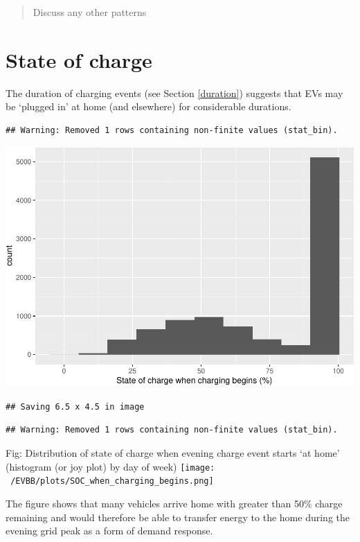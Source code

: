 \documentclass[]{article}
\begin{document}
\begin{quote}
Discuss any other patterns
\end{quote}

\section{State of charge}\label{state-of-charge}

The duration of charging events (see Section \ref{duration}) suggests
that EVs may be `plugged in' at home (and elsewhere) for considerable
durations.

\begin{verbatim}
## Warning: Removed 1 rows containing non-finite values (stat_bin).
\end{verbatim}

\includegraphics{EVBB_report_files/figure-latex/value of state of charge at beginning of charge-1.pdf}

\begin{verbatim}
## Saving 6.5 x 4.5 in image
\end{verbatim}

\begin{verbatim}
## Warning: Removed 1 rows containing non-finite values (stat_bin).
\end{verbatim}

Fig: Distribution of state of charge when evening charge event starts
`at home' (histogram (or joy plot) by day of week)
\texttt{[image: ~/EVBB/plots/SOC\_when\_charging\_begins.png]}

The figure shows that many vehicles arrive home with greater than 50\%
charge remaining and would therefore be able to transfer energy to the
home during the evening grid peak as a form of demand response.
\end{document}
